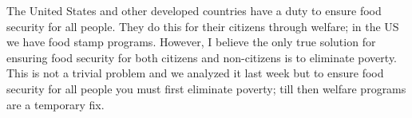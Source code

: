 \documentclass{article}
\begin{document}
The United States and other developed countries have a duty to ensure food security for all people. They do this for their citizens through welfare; in the US we have food stamp programs. However, I believe the only true solution for ensuring food security for both citizens and non-citizens is to eliminate poverty. This is not a trivial problem and we analyzed it last week but to ensure food security for all people you must first eliminate poverty; till then welfare programs are a temporary fix.
\end{document}
